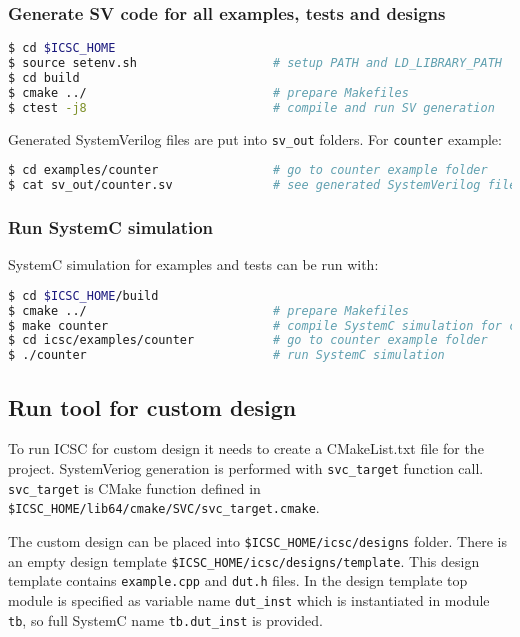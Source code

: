 \subsubsection{Generate SV code for all examples, tests and designs}
%
\begin{lstlisting}[language=bash]
$ cd $ICSC_HOME
$ source setenv.sh                   # setup PATH and LD_LIBRARY_PATH
$ cd build   
$ cmake ../                          # prepare Makefiles 
$ ctest -j8                          # compile and run SV generation
\end{lstlisting}

Generated SystemVerilog files are put into {\tt sv\_out} folders. 
For {\tt counter} example:
% 
\begin{lstlisting}[language=bash]
$ cd examples/counter                # go to counter example folder 
$ cat sv_out/counter.sv              # see generated SystemVerilog file 
\end{lstlisting}

\subsubsection{Run SystemC simulation}

SystemC simulation for examples and tests can be run with:
\begin{lstlisting}[language=bash]
$ cd $ICSC_HOME/build
$ cmake ../                          # prepare Makefiles 
$ make counter                       # compile SystemC simulation for counter example
$ cd icsc/examples/counter           # go to counter example folder
$ ./counter                          # run SystemC simulation 
\end{lstlisting}

\subsection{Run tool for custom design}

To run ICSC for custom design it needs to create a CMakeList.txt file for the project. SystemVeriog generation is performed with {\tt svc\_target} function call. {\tt svc\_target} is CMake function defined in {\tt \$ICSC\_HOME/lib64/cmake/SVC/svc\_target.cmake}. 

The custom design can be placed into {\tt \$ICSC\_HOME/icsc/designs} folder. 
There is an empty design template {\tt\$ICSC\_HOME/icsc/designs/template}. This design template contains {\tt example.cpp} and {\tt dut.h} files. 
In the design template top module is specified as  variable name {\tt dut\_inst} which is instantiated in module {\tt tb}, so full SystemC name {\tt tb.dut\_inst} is provided.

